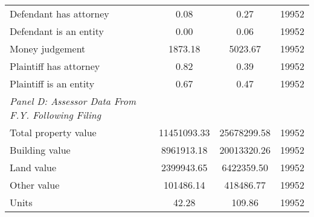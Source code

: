 \begin{table}[htbp]
\begin{tabular}{l*{1}{ccc}}
\hspace{0.25cm}Defendant has attorney&        0.08&        0.27&       19952\\
\hspace{0.25cm}Defendant is an entity&        0.00&        0.06&       19952\\
\hspace{0.25cm}Money judgement&     1873.18&     5023.67&       19952\\
\hspace{0.25cm}Plaintiff has attorney&        0.82&        0.39&       19952\\
\hspace{0.25cm}Plaintiff is an entity&        0.67&        0.47&       19952\\
\emph{Panel D: Assessor Data From F.Y. Following Filing}&            &            &            \\
\hspace{0.25cm}Total property value& 11451093.33& 25678299.58&       19952\\
\hspace{0.25cm}Building value&  8961913.18& 20013320.26&       19952\\
\hspace{0.25cm}Land value&  2399943.65&  6422359.50&       19952\\
\hspace{0.25cm}Other value&   101486.14&   418486.77&       19952\\
\hspace{0.25cm}Units&       42.28&      109.86&       19952\\
\bottomrule
\end{tabular}
\end{table}

